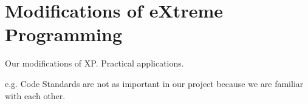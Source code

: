 \section{Modifications of eXtreme Programming}
Our modifications of XP.
Practical applications.

e.g. Code Standards are not as important in our project because we are familiar with each other.
